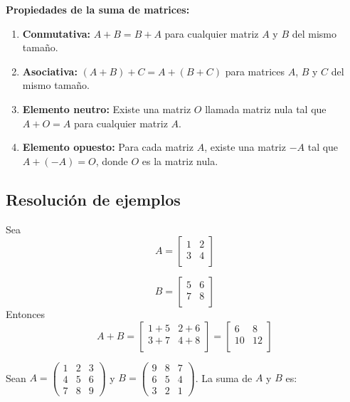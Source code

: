 \begin{}
\begin{remark}
\end{remark}
\textbf{Propiedades de la suma de matrices:}

\begin{enumerate}
    \item \textbf{Conmutativa:} \( A + B = B + A \) para cualquier matriz \( A \) y \( B \) del mismo tamaño.
    
    \item \textbf{Asociativa:} \( (A + B) + C = A + (B + C) \) para matrices \( A \), \( B \) y \( C \) del mismo tamaño.
    
    \item \textbf{Elemento neutro:} Existe una matriz \( O \) llamada matriz nula tal que \( A + O = A \) para cualquier matriz \( A \).
    
    \item \textbf{Elemento opuesto:} Para cada matriz \( A \), existe una matriz \( -A \) tal que \( A + (-A) = O \), donde \( O \) es la matriz nula.
\end{enumerate}



\subsection{Resolución de ejemplos}

\begin{example} Sea
$$
A =
\begin{bmatrix}
    1 & 2 \\
    3 & 4 \\
\end{bmatrix}
$$

$$
B =
\begin{bmatrix}
    5 & 6 \\
    7 & 8 \\
\end{bmatrix}
$$ Entonces $$
A + B =
\begin{bmatrix}
    1+5 & 2+6 \\
    3+7 & 4+8 \\
\end{bmatrix}
=
\begin{bmatrix}
    6 & 8 \\
    10 & 12 \\
\end{bmatrix}
$$
\end{example}
\begin{example}
 Sean $A = \begin{pmatrix}
1 & 2 & 3 \\
4 & 5 & 6 \\
7 & 8 & 9
\end{pmatrix}$ y $B = \begin{pmatrix}
9 & 8 & 7 \\
6 & 5 & 4 \\
3 & 2 & 1
\end{pmatrix}$. La suma de $A$ y $B$ es:


\end{example}
\end{}
